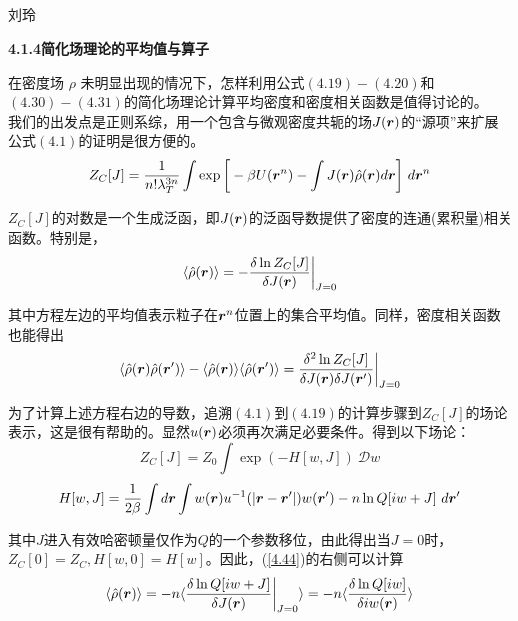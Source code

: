 \subsection{ }

\begin{center}
刘玲
\end{center}

\textbf{4.1.4简化场理论的平均值与算子}

在密度场 $\rho $ 未明显出现的情况下，怎样利用公式$(4.19)-(4.20)$和$(4.30)-(4.31)$的简化场理论计算平均密度和密度相关函数是值得讨论的。\\

我们的出发点是正则系综，用一个包含与微观密度共轭的场$J(\bm{r})$的“源项”来扩展公式$(4.1)$的证明是很方便的。\\
\begin{equation}
Z_{C}[J]=\frac{1}{n! \lambda _{T}^{3n}} \int  \exp \bigg[-\beta U(\bm{r}^{n})- \int J(\bm{r}) \hat{ \rho }(\bm{r})d\bm{r} \bigg]~ d \bm{r}^{n}
\end{equation}

$Z_{C}[J]$的对数是一个生成泛函，即$J(\bm{r})$的泛函导数提供了密度的连通(累积量)相关函数。特别是，\\
\begin{equation}
\langle \hat{ \rho } (\bm{r}) \rangle = - \frac{\delta \ln Z_{C}[J] }{\delta J(\bm{r})} \bigg |_{J=0}
\label{4.44}
\end{equation}

其中方程左边的平均值表示粒子在$\bm{r}^{n}$位置上的集合平均值。同样，密度相关函数也能得出\\
\begin{equation}
\langle \hat{ \rho } (\bm{r}) \hat{ \rho } (\bm{r}')\rangle - \langle  \hat{ \rho } (\bm{r}) \rangle \langle  \hat{ \rho } (\bm{r}') \rangle = \frac{\delta ^{2} \ln Z_{C}[J]}{\delta J(\bm{r}) \delta J(\bm{r}')} \bigg |_{J=0}
\end{equation}

为了计算上述方程右边的导数，追溯$(4.1)$到$(4.19)$的计算步骤到$Z_{C}[J]$的场论表示，这是很有帮助的。显然$u(\bm{r})$必须再次满足必要条件。得到以下场论：\\
\begin{equation}
Z_{C}[J]=Z_{0} \int \exp (-H[w,J]) ~\mathcal{D} w 
\end{equation}
\begin{equation}
H[w ,J]=\frac{1}{2 \beta } \int d\bm{r} \int w (\bm{r}) u^{-1} (|\bm{r}-\bm{r}'|) w (\bm{r}') - n \ln Q[i w +J] ~d\bm{r}'
\end{equation}

其中$J$进入有效哈密顿量仅作为$Q$的一个参数移位，由此得出当$J=0$时，$Z_{C}[0]=Z_{C},H[ w,0]=H[ w ]$。因此，(\ref{4.44})的右侧可以计算\\
\begin{equation}
\langle \hat{ \rho } (\bm{r}) \rangle = - n \langle \frac{ \delta \ln Q[i w + J ]}{ \delta J(\bm{r}) } \bigg|_{J=0} \rangle = -n \langle \frac{\delta \ln Q[ i w]}{ \delta i w (\bm{r})} \rangle
\label{4.48}
\end{equation}

